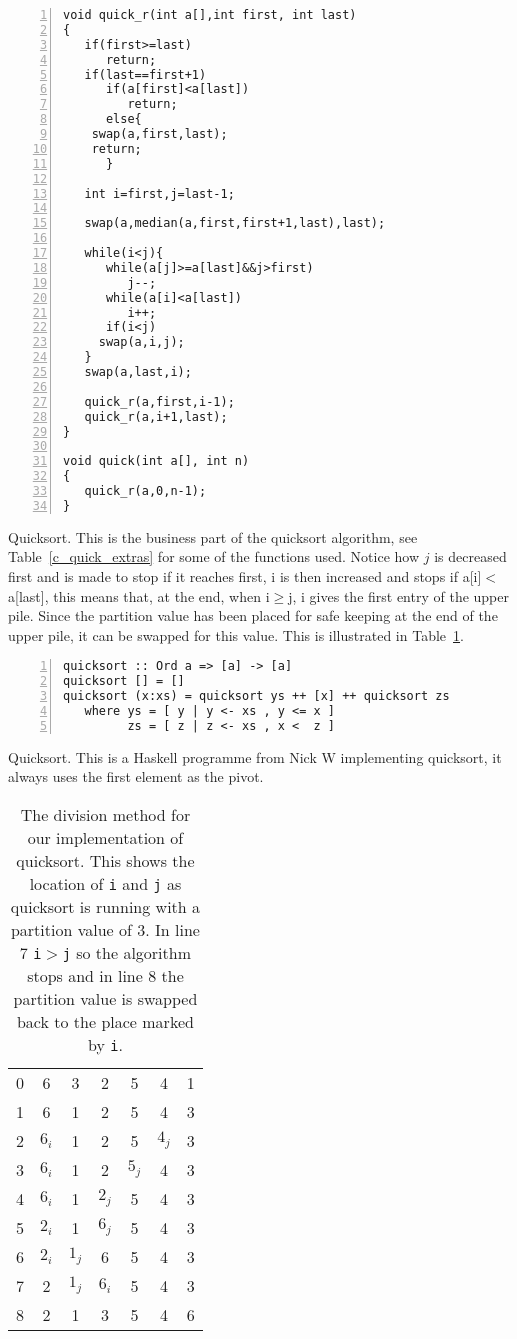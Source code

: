 \documentclass[11pt,a4paper]{scrartcl}
\begin{document}
\begin{table}
\begin{lstlisting}[numbers=left]
void quick_r(int a[],int first, int last)
{
   if(first>=last)
      return;
   if(last==first+1)
      if(a[first]<a[last])
         return;
      else{
	swap(a,first,last);
	return;
      }

   int i=first,j=last-1;

   swap(a,median(a,first,first+1,last),last);
  
   while(i<j){
      while(a[j]>=a[last]&&j>first)
         j--;
      while(a[i]<a[last])
         i++;
      if(i<j)
	 swap(a,i,j);
   }
   swap(a,last,i);

   quick_r(a,first,i-1);
   quick_r(a,i+1,last);
}

void quick(int a[], int n)
{
   quick_r(a,0,n-1);
}
\end{lstlisting}
\caption{Quicksort. This is the business part of the quicksort
  algorithm, see Table~\ref{c_quick_extras} for some of the functions
  used. Notice how $j$ is decreased first and is made to stop if it
  reaches first, i is then increased and stops if a[i]$<$a[last], this
  means that, at the end, when i$\ge$j, i gives the first entry of the
  upper pile. Since the partition value has been placed for safe
  keeping at the end of the upper pile, it can be swapped for this
  value. This is illustrated in
  Table~\ref{table_quick_careful}.\label{c_quick}}
\end{table}


\begin{table}
\begin{lstlisting}[numbers=left]
quicksort :: Ord a => [a] -> [a]
quicksort [] = []
quicksort (x:xs) = quicksort ys ++ [x] ++ quicksort zs
   where ys = [ y | y <- xs , y <= x ]
         zs = [ z | z <- xs , x <  z ]
\end{lstlisting}
\caption{Quicksort. This is a Haskell programme from Nick W
  implementing quicksort, it always uses the first element as the
  pivot.\label{haskell_quick}}
\end{table}


\begin{table}
\begin{tabular}{c|cccccc}
0&6&3&2&5&4&1\\
1&6&1&2&5&4&3\\
2&$6_i$&1&2&5&$4_j$&3\\
3&$6_i$&1&2&$5_j$&4&3\\
4&$6_i$&1&$2_j$&5&4&3\\
5&$2_i$&1&$6_j$&5&4&3\\
6&$2_i$&$1_j$&6&5&4&3\\
7&2&$1_j$&$6_i$&5&4&3\\
8&2&1&3&5&4&6
\end{tabular}
\caption{The division method for our implementation of quicksort. This
  shows the location of \texttt{i} and \texttt{j} as quicksort is running with a partition value of 3. In line 7 \texttt{i}$>$\texttt{j}
  so the algorithm stops and in line 8 the partition value is swapped
  back to the place marked by \texttt{i}.\label{table_quick_careful}}
\end{table}
\end{document}
